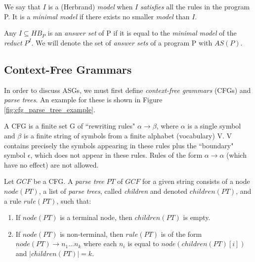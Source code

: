 \begin{definition}
We say that $I$ is a (Herbrand) \textit{model} when $I$ \textit{satisfies} all the rules in the program P. It is a \textit{minimal model} if there exists no smaller \textit{model} than $I$.
\end{definition}

\begin{definition}
Any $I \subseteq HB_P$ is an \textit{answer set} of P if it is equal to the \textit{minimal model}  of the \textit{reduct} $P^I$. We will denote the set of \textit{answer sets} of a program P with $AS(P)$. 
\end{definition}

\subsection{Context-Free Grammars}

In order to discuss ASGs, we must first define \textit{context-free grammars} (CFGs) and \textit{parse trees}. An example for these is shown in Figure \ref{fig:cfg_parse_tree_example}.

\begin{definition}
A CFG is a finite set G of ``rewriting rules" $\alpha \to \beta$, where $\alpha$ is a single symbol and $\beta$ is a finite string of symbols from a finite alphabet (vocabulary) V. V contains precisely the symbols appearing in these rules plus the ``boundary" symbol $\epsilon$, which does not appear in these rules. Rules of the form $\alpha \to \alpha$ (which have no effect) are not allowed.
\end{definition}

\begin{definition}
Let $GCF$ be a CFG. A \textit{parse tree} $PT$ of $GCF$ for a given string consists of a node $node(PT)$, a list of \textit{parse trees}, called \textit{children} and denoted $children(PT)$, and a rule $rule(PT)$, such that:
\begin{enumerate}[nolistsep]
\item If $node(PT)$ is a terminal node, then $children(PT)$ is empty.
\item If $node(PT)$ is non-terminal, then $rule(PT)$ is of the form $node(PT) \to n_1 ... n_k$ where each $n_i$ is equal to $node(children(PT)[i])$ and $|children(PT)| = k$.
\end{enumerate}
\end{definition}

